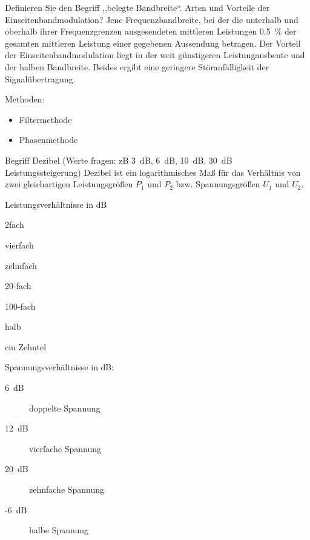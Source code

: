 \documentclass[avery5371,grid,frame,a4paper]{flashcards}
\newcommand{\card}[3]{
  \begin{flashcard}[{\chap} -- #1]{#2}#3\end{flashcard}
}
\begin{document}
\card{19}{Definieren Sie den Begriff ,,belegte Bandbreite``. Arten und Vorteile der Einseitenbandmodulation?}{
  \small
  Jene Frequenzbandbreite, bei der die unterhalb und oberhalb ihrer Frequenzgrenzen ausgesendeten mittleren Leistungen \SI{0,5}{\percent} der gesamten mittleren Leistung einer gegebenen Aussendung betragen.
  Der Vorteil der Einseitenbandmodulation liegt in der weit günstigeren Leistungausbeute und der halben Bandbreite. Beides ergibt eine geringere Störanfälligkeit der Signalübertragung.

  Methoden:
  \begin{itemize}
    \item Filtermethode
    \item Phasenmethode
  \end{itemize}
}
\card{21}{Begriff Dezibel (Werte fragen: zB 3~dB, 6~dB, \SI{10}{\dB}, \SI{30}{\dB} Leistungssteigerung)}{
  {\small
    Dezibel ist ein logarithmisches Maß für das Verhältnis von zwei gleichartigen Leistungsgrößen
    $P_1$ und $P_2$ bzw. Spannungsgrößen $U_1$ und $U_2$.}

  {\scriptsize
    \begin{minipage}{0.45\textwidth}
      \vspace{5pt} Leistungsverhältnisse in dB\vspace{-8pt}
      \begin{description}\itemsep0pt
        \item[3~dB] 2fach
        \item[6~dB] vierfach
        \item[\SI{10}{\dB}] zehnfach
        \item[\SI{13}{\dB}] 20-fach
        \item[\SI{20}{\dB}] 100-fach
        \item[-3~dB] halb
        \item[-\SI{10}{\dB}] ein Zehntel
      \end{description}
      \end{minipage}
      \begin{minipage}{0.5\textwidth}
      Spannungsverhältnisse in dB:
      \begin{description}
        \item[6~dB] doppelte Spannung
        \item[\SI{12}{\dB}] vierfache Spannung
        \item[\SI{20}{\dB}] zehnfache Spannung
        \item[-6~dB] halbe Spannung
      \end{description}
    \end{minipage}
  }
}
\end{document}

